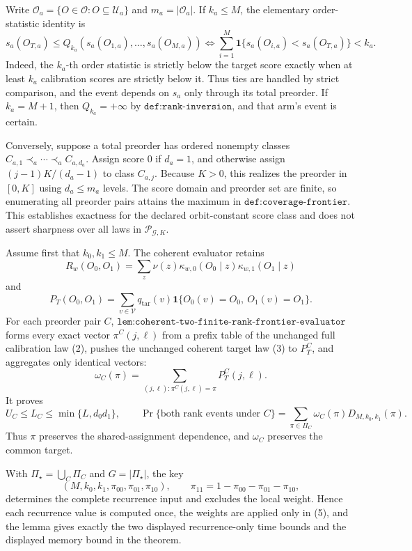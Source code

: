 Write \(\mathcal O_a=\{O\in\mathcal O:O\subseteq\mathcal U_a\}\) and \(m_a=|\mathcal O_a|\).  If \(k_a\le M\), the elementary order-statistic identity is
\[
s_a(O_{T,a})\le Q_{k_a}(s_a(O_{1,a}),\ldots,s_a(O_{M,a}))
\Longleftrightarrow
\sum_{i=1}^M\mathbf 1\{s_a(O_{i,a})<s_a(O_{T,a})\}<k_a. \tag{1}
\]
Indeed, the \(k_a\)-th order statistic is strictly below the target score exactly when at least \(k_a\) calibration scores are strictly below it.  Thus ties are handled by strict comparison, and the event depends on \(s_a\) only through its total preorder.  If \(k_a=M+1\), then \(Q_{k_a}=+\infty\) by \(\texttt{def:rank-inversion}\), and that arm's event is certain.

Conversely, suppose a total preorder has ordered nonempty classes \(C_{a,1}\prec_a\cdots\prec_a C_{a,d_a}\).  Assign score \(0\) if \(d_a=1\), and otherwise assign \((j-1)K/(d_a-1)\) to class \(C_{a,j}\).  Because \(K>0\), this realizes the preorder in \([0,K]\) using \(d_a\le m_a\) levels.  The score domain and preorder set are finite, so enumerating all preorder pairs attains the maximum in \(\texttt{def:coverage-frontier}\).  This establishes exactness for the declared orbit-constant score class and does not assert sharpness over all laws in \(\mathcal P_{\mathcal G,K}\).

Assume first that \(k_0,k_1\le M\).  The coherent evaluator retains
\[
R_w(O_0,O_1)=\sum_z\nu(z)\kappa_{w,0}(O_0\mid z)\kappa_{w,1}(O_1\mid z) \tag{2}
\]
and
\[
P_T(O_0,O_1)=\sum_{v\in\mathcal V}q_{\mathrm{tar}}(v)
\mathbf 1\{O_0(v)=O_0,\ O_1(v)=O_1\}. \tag{3}
\]
For each preorder pair \(C\), \(\texttt{lem:coherent-two-finite-rank-frontier-evaluator}\) forms every exact vector \(\pi^C(j,\ell)\) from a prefix table of the unchanged full calibration law (2), pushes the unchanged coherent target law (3) to \(P_T^C\), and aggregates only identical vectors:
\[
\omega_C(\pi)=\sum_{(j,\ell):\pi^C(j,\ell)=\pi}P_T^C(j,\ell). \tag{4}
\]
It proves
\[
U_C\le L_C\le\min\{L,d_0d_1\},\qquad
\Pr\{\text{both rank events under }C\}
=\sum_{\pi\in\Pi_C}\omega_C(\pi)D_{M,k_0,k_1}(\pi). \tag{5}
\]
Thus \(\pi\) preserves the shared-assignment dependence, and \(\omega_C\) preserves the common target.

With \(\Pi_\star=\bigcup_C\Pi_C\) and \(G=|\Pi_\star|\), the key
\[
(M,k_0,k_1,\pi_{00},\pi_{01},\pi_{10}),\qquad
\pi_{11}=1-\pi_{00}-\pi_{01}-\pi_{10}, \tag{6}
\]
determines the complete recurrence input and excludes the local weight.  Hence each recurrence value is computed once, the weights are applied only in (5), and the lemma gives exactly the two displayed recurrence-only time bounds and the displayed memory bound in the theorem.

